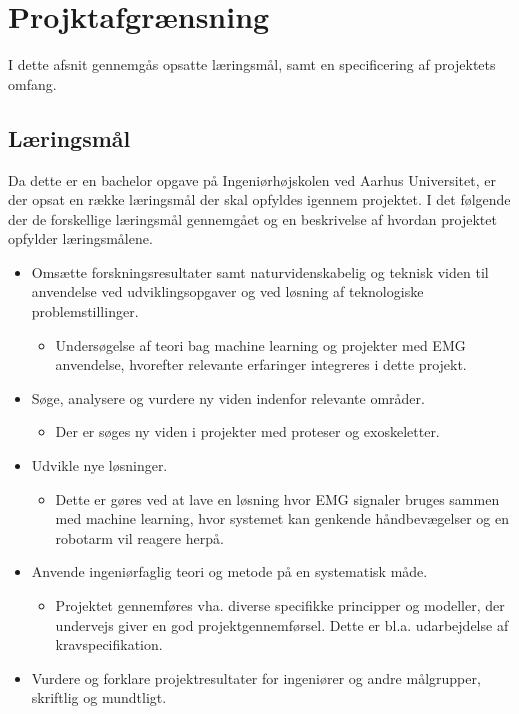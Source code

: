 \thispagestyle{fancy}
\chapter{Projktafgrænsning}
\label{chp:projektafgraensning}
I dette afsnit gennemgås opsatte læringsmål, samt en specificering af projektets omfang. 
\section{Læringsmål}
Da dette er en bachelor opgave på Ingeniørhøjskolen ved Aarhus Universitet, er der opsat en række læringsmål der skal opfyldes igennem projektet. I det følgende der de forskellige læringsmål gennemgået og en beskrivelse af hvordan projektet opfylder læringsmålene.
\begin{itemize}
	\item Omsætte forskningsresultater samt naturvidenskabelig og teknisk viden til anvendelse ved udviklingsopgaver og ved løsning af teknologiske problemstillinger.
	\begin{itemize}
		\item Undersøgelse af teori bag machine learning og projekter med EMG anvendelse, hvorefter relevante erfaringer integreres i dette projekt. 
	\end{itemize}
	\item Søge, analysere og vurdere ny viden indenfor relevante områder.
	\begin{itemize}
		\item Der er søges ny viden i projekter med proteser og exoskeletter. 
	\end{itemize}
	\item Udvikle nye løsninger.
	\begin{itemize}
		\item Dette er gøres ved at lave en løsning hvor EMG signaler bruges sammen med machine learning, hvor systemet kan genkende håndbevægelser og en robotarm vil reagere herpå.
	\end{itemize}
	\item Anvende ingeniørfaglig teori og metode på en systematisk måde.
	\begin{itemize}
		\item Projektet gennemføres vha. diverse specifikke principper og modeller, der undervejs giver en god projektgennemførsel. Dette er bl.a. udarbejdelse af kravspecifikation.
	\end{itemize}
	\item Vurdere og forklare projektresultater for ingeniører og andre målgrupper, skriftlig og mundtligt.

\end{itemize}

